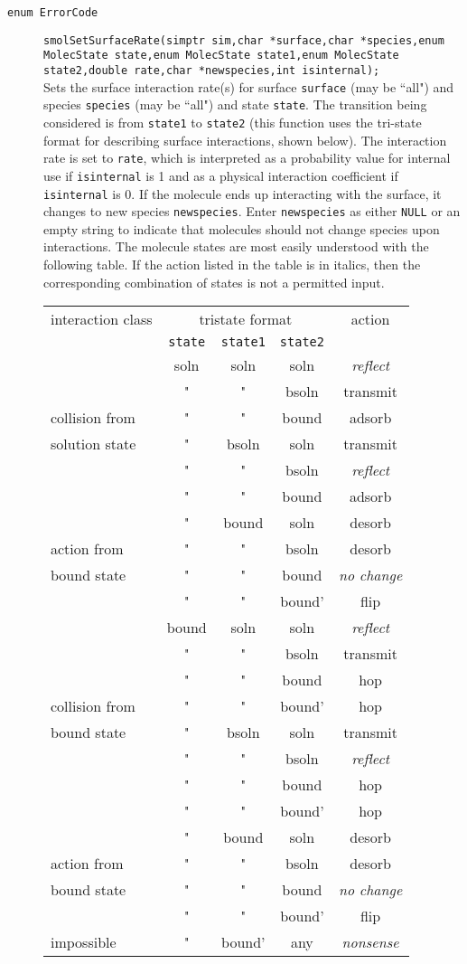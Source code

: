 \documentclass {book}
\begin{document}
\begin{description}
\item[\texttt{enum ErrorCode}]
\texttt{smolSetSurfaceRate(simptr sim,char *surface,char *species,enum MolecState state,enum MolecState state1,enum MolecState state2,double rate,char *newspecies,int isinternal);}
\hfill \\
Sets the surface interaction rate(s) for surface \texttt{surface} (may be ``all") and species \texttt{species} (may be ``all") and state \texttt{state}. The transition being considered is from \texttt{state1} to \texttt{state2} (this function uses the tri-state format for describing surface interactions, shown below). The interaction rate is set to \texttt{rate}, which is interpreted as a probability value for internal use if \texttt{isinternal} is 1 and as a physical interaction coefficient if \texttt{isinternal} is 0. If the molecule ends up interacting with the surface, it changes to new species \texttt{newspecies}. Enter \texttt{newspecies} as either \texttt{NULL} or an empty string to indicate that molecules should not change species upon interactions. The molecule states are most easily understood with the following table. If the action listed in the table is in italics, then the corresponding combination of states is not a permitted input.

\begin{longtable}[c]{l|ccc|c}
interaction class&\multicolumn{3}{c}{tristate format}&action\\
&\texttt{state}&\texttt{state1}&\texttt{state2}&\\
\hline
&soln&soln&soln&\emph{reflect}\\
&"&"&bsoln&transmit\\
collision from&"&"&bound&adsorb\\
solution state&"&bsoln&soln&transmit\\
&"&"&bsoln&\emph{reflect}\\
&"&"&bound&adsorb\\
\hline
&"&bound&soln&desorb\\
action from&"&"&bsoln&desorb\\
bound state&"&"&bound&\emph{no change}\\
&"&"&bound'&flip\\
\hline
&bound&soln&soln&\emph{reflect}\\
&"&"&bsoln&transmit\\
&"&"&bound&hop\\
collision from&"&"&bound'&hop\\
bound state&"&bsoln&soln&transmit\\
&"&"&bsoln&\emph{reflect}\\
&"&"&bound&hop\\
&"&"&bound'&hop\\
\hline
&"&bound&soln&desorb\\
action from&"&"&bsoln&desorb\\
bound state&"&"&bound&\emph{no change}\\
&"&"&bound'&flip\\
\hline
impossible&"&bound'&any&\emph{nonsense}\\
\end{longtable}


\end{description}
\end{document}
